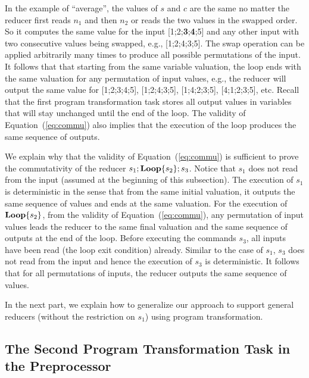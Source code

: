 \documentclass{llncs}
\newcommand{\rloop}{
	\ifmmode
	\mathbf{Loop}
	\else
	\textbf{Loop}
	\fi}
\begin{document}
In the example of ``average'', the values of $s$ and $c$ are the same no matter the reducer first reads $n_1$ and then $n_2$ or reads the two values in the swapped order.
So it computes the same value for the input [1;2;\textbf{3};\textbf{4};5] and any other input with two consecutive values being swapped, e.g., [1;2;4;3;5].
The swap operation can be applied arbitrarily many times to produce all possible permutations of the input.
It follows that that starting from the same variable valuation, the loop ends with the same valuation for any permutation of input values, e.g., the reducer will output the same value for [1;2;3;4;5], [1;2;4;3;5], [1;4;2;3;5], [4;1;2;3;5], etc. 
Recall that the first program transformation task stores all output values in variables that will stay unchanged until the end of the loop. The validity of Equation~(\ref{eq:commu}) also implies that the execution of the loop produces the same sequence of outputs.

We explain why that the validity of Equation~(\ref{eq:commu}) is sufficient to prove the commutativity of the reducer $s_1;\rloop\{s_2\};s_3$. Notice that $s_1$ does not read from the input (assumed at the beginning of this subsection). The execution of $s_1$ is deterministic in the sense that from the same initial valuation, it outputs the same sequence of values and ends at the same valuation. For the execution of $\rloop\{s_2\}$, from the validity of Equation~(\ref{eq:commu}), any permutation of input values leads the reducer to the same final valuation and the same sequence of outputs at the end of the loop. 
Before executing the commands $s_3$, all inputs have been read (the loop exit condition) already. Similar to the case of $s_1$, $s_3$ does not read from the input and hence the execution of $s_3$ is deterministic. It follows that for all permutations of inputs, the reducer outputs the same sequence of values. 

In the next part, we explain how to generalize our approach to support general reducers (without the restriction on $s_1$) using program transformation.

\subsection{The Second Program Transformation Task in the Preprocessor}
\label{sec:program_trans2}
\end{document}
